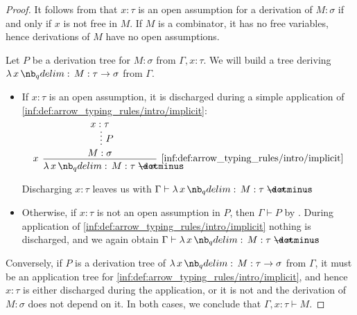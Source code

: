 \begin{proof}
   It follows from  that \( x: \tau \) is an open assumption for a derivation of \( M: \sigma \) if and only if \( x \) is not free in \( M \). If \( M \) is a combinator, it has no free variables, hence derivations of \( M \) have no open assumptions.


  \SufficiencySubProof* Let \( P \) be a derivation tree for \( M: \sigma \) from \( \Gamma, x: \tau \). We will build a tree deriving \( \qabs x M: \tau \to \sigma \) from \( \Gamma \).

  \begin{itemize}
    \item If \( x: \tau \) is an open assumption, it is discharged during a simple application of \ref{inf:def:arrow_typing_rules/intro/implicit}:
    \begin{equation*}
      \begin{prooftree}
        \hypo{ x: \tau }
        \ellipsis { \( P \) } { M: \sigma }
        \infer[left label=\( x \)]1[\ref{inf:def:arrow_typing_rules/intro/implicit}]{ \qabs x M: \tau \synimplies \sigma }
      \end{prooftree}
    \end{equation*}

    Discharging \( x: \tau \) leaves us with \( \Gamma \vdash \qabs x M: \tau \synimplies \sigma \).

    \item Otherwise, if \( x: \tau \) is not an open assumption in \( P \), then \( \Gamma \vdash P \) by . During application of \ref{inf:def:arrow_typing_rules/intro/implicit} nothing is discharged, and we again obtain \( \Gamma \vdash \qabs x M: \tau \synimplies \sigma \).
  \end{itemize}

  \NecessitySubProof* Conversely, if \( P \) is a derivation tree of \( \qabs x M: \tau \to \sigma \) from \( \Gamma \), it must be an application tree for \ref{inf:def:arrow_typing_rules/intro/implicit}, and hence \( x: \tau \) is either discharged during the application, or it is not and the derivation of \( M: \sigma \) does not depend on it. In both cases, we conclude that \( \Gamma, x: \tau \vdash M \).
\end{proof}

